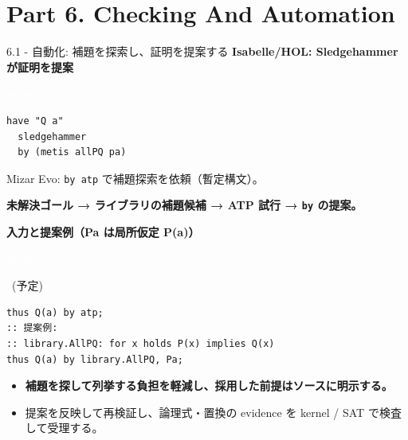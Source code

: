 \documentclass[dvipdfmx,aspectratio=169,11pt]{beamer}
\newcommand{\statusbadge}[2]{\colorbox{#1}{\textcolor{white}{\strut\scriptsize\sffamily\bfseries #2}}}
\newcommand{\badgeSketch}{\statusbadge{orange!75!black}{sketch}}
\begin{document}
\section{Part 6. Checking And Automation}
\begin{frame}[fragile,t]{6.1 - 自動化: 補題を探索し、証明を提案する}
\smallskip
\textbf{Isabelle/HOL: Sledgehammer が証明を提案}~\badgeSketch
\begin{lstlisting}[language={},basicstyle=\ttfamily\small]
have "Q a"
  sledgehammer
  by (metis allPQ pa)
\end{lstlisting}
Mizar Evo: \texttt{by atp} で補題探索を依頼（暫定構文）。

\textcolor{blue!55!black}{\textbf{未解決ゴール → ライブラリの補題候補 → ATP 試行 → \texttt{by} の提案。}}

\smallskip
\textbf{入力と提案例（Pa は局所仮定 P(a)）}~\badgeSketch~{\footnotesize(予定)}
\begin{lstlisting}[language={mizar},basicstyle=\ttfamily\small]
thus Q(a) by atp;
:: 提案例:
:: library.AllPQ: for x holds P(x) implies Q(x)
thus Q(a) by library.AllPQ, Pa;
\end{lstlisting}
\begin{itemize}
\setlength{\itemsep}{1pt}
\setlength{\parsep}{0pt}
\setlength{\parskip}{0pt}
\item \textcolor{blue!55!black}{\textbf{補題を探して列挙する負担を軽減し、採用した前提はソースに明示する。}}
\item 提案を反映して再検証し、論理式・置換の evidence を kernel / SAT で検査して受理する。
\end{itemize}
\end{frame}
\end{document}
